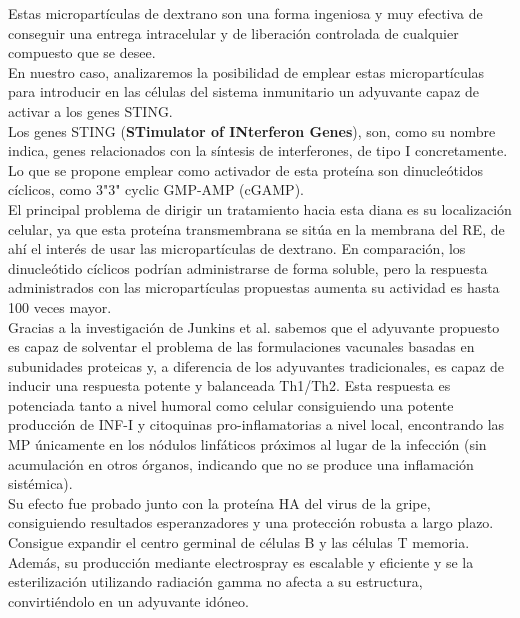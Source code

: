 \documentclass[a4paper,11pt]{article}
\begin{document}
Estas micropartículas de dextrano son una forma ingeniosa y muy efectiva de conseguir una entrega intracelular y de liberación controlada de cualquier compuesto que se desee. 
\\En nuestro caso, analizaremos la posibilidad de emplear estas micropartículas para introducir en las células del sistema inmunitario un adyuvante capaz de activar a los genes STING.
\\Los genes STING (\textbf{STimulator of INterferon Genes}), son, como su nombre indica, genes relacionados con la síntesis de interferones, de tipo I concretamente. Lo que se propone emplear como activador de esta proteína son dinucleótidos cíclicos, como 3"3" cyclic GMP-AMP (cGAMP).
\\El principal problema de dirigir un tratamiento hacia esta diana es su localización celular, ya que esta proteína transmembrana se sitúa en la membrana del RE, de ahí el interés de usar las micropartículas de dextrano. En comparación, los dinucleótido cíclicos podrían administrarse de forma soluble, pero la respuesta administrados con las micropartículas propuestas aumenta su actividad es hasta 100 veces mayor.
\\Gracias a la investigación de Junkins et al. sabemos que el adyuvante propuesto es capaz de solventar el problema de las formulaciones vacunales basadas en subunidades proteicas y, a diferencia de los adyuvantes tradicionales, es capaz de inducir una respuesta potente y balanceada Th1/Th2. Esta respuesta es potenciada tanto a nivel humoral como celular consiguiendo una potente producción de INF-I y citoquinas pro-inflamatorias a nivel local, encontrando las MP únicamente en los nódulos linfáticos próximos al lugar de la infección (sin acumulación en otros órganos, indicando que no se produce una inflamación sistémica).
\\Su efecto fue probado junto con la proteína HA del virus de la gripe, consiguiendo resultados esperanzadores y una protección robusta a largo plazo. Consigue expandir el centro germinal de células B y las células T memoria.
\\Además, su producción mediante electrospray es escalable y eficiente y se la esterilización utilizando radiación gamma no afecta a su estructura, convirtiéndolo en un adyuvante idóneo.
\end{document}
